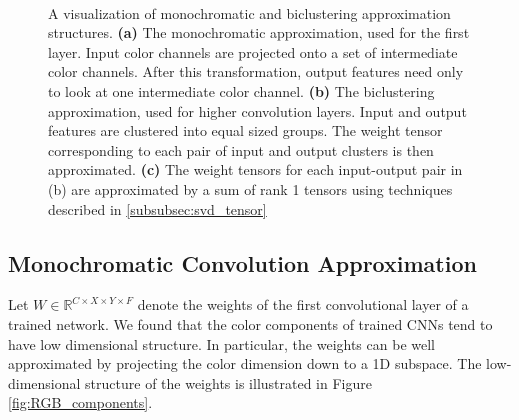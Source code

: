 \vspace{-3mm}
\begin{figure}[ht]
\centering
\mbox{
\hspace{1mm}
\hspace{1mm}
}
\vspace{-3mm}
\caption{ A visualization of monochromatic and biclustering approximation structures. {\bf (a)} The monochromatic approximation, used for the first layer. Input color channels are projected onto a set of intermediate color channels. After this transformation, output features need only to look at one intermediate color channel. {\bf (b)} The biclustering approximation, used for higher convolution layers. Input and output features are clustered into equal sized groups. The weight tensor corresponding to each pair of input and output clusters is then approximated. {\bf (c)} The weight tensors for each input-output pair in (b) are approximated by a sum of rank 1 tensors using techniques described in \ref{subsubsec:svd_tensor}}
\end{figure}

\subsection{Monochromatic Convolution Approximation}\label{subsec:monochromatic}
Let $W \in \mathbb{R}^{C \times X \times Y \times F}$ denote the
weights of the first convolutional layer of a trained network.  
We found that the color components
 of trained CNNs tend to have low dimensional structure. In
particular, the weights can be well approximated by projecting the
color dimension down to a 1D subspace.
The low-dimensional structure of the weights is illustrated in Figure
\ref{fig:RGB_components}.

